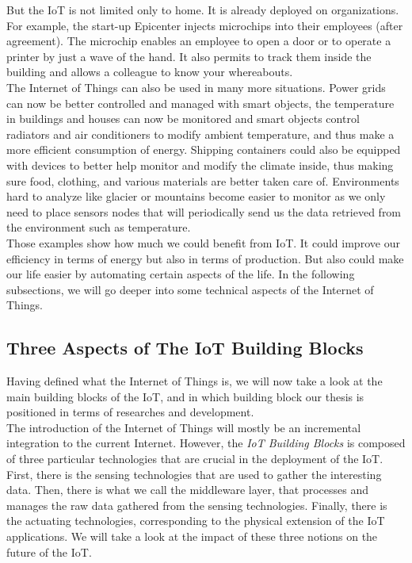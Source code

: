 But the IoT is not limited only to home. It is already deployed on organizations. For example, the start-up Epicenter injects microchips into their employees (after agreement)\cite{website:lat_04_17}. The microchip enables an employee to open a door or to operate a printer by just a wave of the hand. It also permits to track them inside the building and allows a colleague to know your whereabouts. \\

The Internet of Things can also be used in many more situations. Power grids can now be better controlled and managed with smart objects, the temperature in buildings and houses can now be monitored and smart objects control radiators and air conditioners to modify ambient temperature, and thus make a more efficient consumption of energy. Shipping containers could also be equipped with devices to better help monitor and modify the climate inside, thus making sure food, clothing, and various materials are better taken care of. Environments hard to analyze like glacier or mountains become easier to monitor as we only need to place sensors nodes that will periodically send us the data retrieved from the environment such as temperature. \\

Those examples show how much we could benefit from IoT. It could improve our efficiency in terms of energy but also in terms of production. But also could make our life easier by automating certain aspects of the life. In the following subsections, we will go deeper into some technical aspects of the Internet of Things. \\

\subsection{Three Aspects of The IoT Building Blocks}

Having defined what the Internet of Things is, we will now take a look at the main building blocks of the IoT, and in which building block our thesis is positioned in terms of researches and development. \\

The introduction of the Internet of Things will mostly be an incremental integration to the current Internet. However, the \textit{IoT Building Blocks} is composed of three particular technologies that are crucial in the deployment of the IoT. First, there is the sensing technologies that are used to gather the interesting data. Then, there is what we call the middleware layer, that processes and manages the raw data gathered from the sensing technologies. Finally, there is the actuating technologies, corresponding to the physical extension of the IoT applications. We will take a look at the impact of these three notions on the future of the IoT.\\

